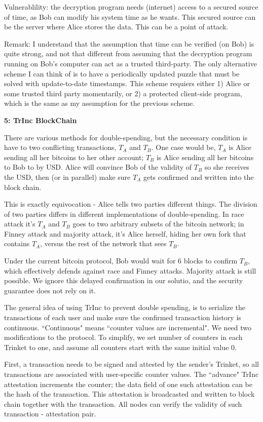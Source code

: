 \documentclass[10pt]{article}
\newcommand\question[2]{\vspace{.1in}\textbf{#1: #2}\vspace{.5em}\vspace{.10in}}
\begin{document}
Vulnerablility: the decryption program needs (internet) access to a secured
source of time, as Bob can modify his system time as he wants. This secured
source can be the server where Alice stores the data. This can be a point of
attack.

Remark: I understand that the assumption that time can be verified (on Bob) is
quite strong, and not that different from assuming that the decryption program
running on Bob's computer can act as a trusted third-party. The only alternative
scheme I can think of is to have a periodically updated puzzle that must be
solved with update-to-date timestamps. This scheme requiers either 1) Alice or
some trusted third party momentarily, or 2) a protected client-side program,
which is the same as my assumption for the previous scheme.


\newpage
\question{5}{TrInc BlockChain}

There are various methods for double-spending, but the necessary condition is
have to two conflicting transactions, $T_A$ and $T_B$. One case would be, $T_A$
is Alice sending all her bitcoins to her other account; $T_B$ is Alice sending
all her bitcoins to Bob to by USD. Alice will convince Bob of the validity of
$T_B$ so she receives the USD, then (or in parallel) make sure $T_A$ gets
confirmed and written into the block chain.

This is exactly equivocation - Alice tells two parties different things.  The
division of two parties differs in different implementations of double-spending.
In race attack it's $T_A$ and $T_B$ goes to two arbitrary subsets of the bitcoin
network; in Finney attack and majority attack, it's Alice herself, hiding her
own fork that contains $T_A$, versus the rest of the network that sees $T_B$.

Under the current bitcoin protocol, Bob would wait for 6 blocks to confirm
$T_B$, which effectively defends against race and Finney attacks. Majority
attack is still possible. We ignore this delayed confirmation in our solutio,
and the security guarantee does not rely on it.

The general idea of using TrInc to prevent double spending, is to serialize the
transactions of each user and make sure the confirmed transaction history is
continuous. ``Continuous" means ``counter values are incremental".
We need two modifications to the protocol. To simplify, we set number of
counters in each Trinket to one, and assume all counters start with the same
initial value $0$.

First, a transaction needs to be signed and attested by the sender's Trinket, so
all transactions are associated with user-specific counter values. The
``advance" TrInc attestation increments the counter; the data field of one such
attestation can be the hash of the transaction. This attestation is broadcasted
and written to block chain together with the transaction. All nodes can verify
the validity of such transaction - attestation pair.
\end{document}
